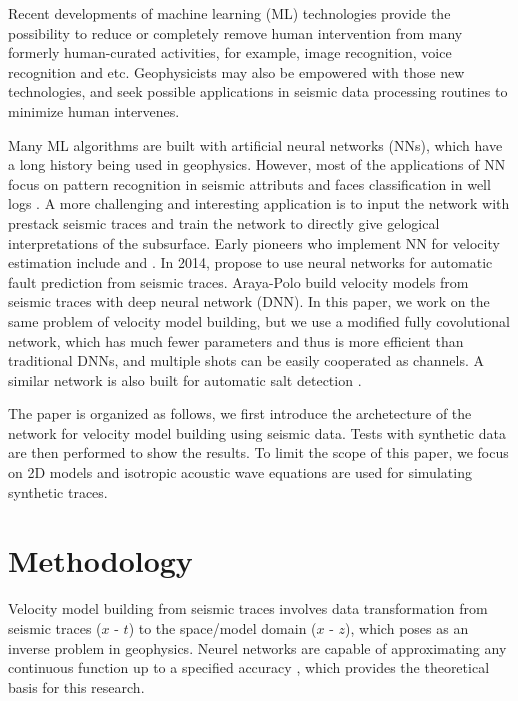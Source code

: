 \documentclass{segabs}
\begin{document}
Recent developments of machine learning (ML) technologies provide the possibility to reduce or completely remove human intervention from many formerly human-curated activities, for example, image recognition, voice recognition and etc. Geophysicists may also be empowered with those new technologies, and seek possible applications in seismic data processing routines to minimize human intervenes.

Many ML algorithms are built with artificial neural networks (NNs), which have a long history being used in geophysics. However, most of the applications of NN focus on pattern recognition in seismic attributs  \citep{zeng04,zhao15} and faces classification in well logs \citep{lim05,hall16}. A more challenging and interesting application is to input the network with prestack seismic traces and train the network to directly give gelogical interpretations of the subsurface. Early pioneers who implement NN for velocity estimation include \citet{roth94} and \citet{nath99}.
In 2014, \citet{zhang14} propose to use neural networks for automatic fault prediction from seismic traces. Araya-Polo \citet{araya18} build velocity models from seismic traces with deep neural network (DNN). 
In this paper, we work on the same problem of velocity model building, but we use a modified fully covolutional network, which has much fewer parameters and thus is more efficient than traditional DNNs, and multiple shots can be easily cooperated as channels. A similar network is also built for automatic salt detection \citep{wenlong18_salt}.

The paper is organized as follows, we first introduce the archetecture of the network for velocity model building using seismic data. Tests with synthetic data are then performed to show the results. To limit the scope of this paper, we focus on 2D models and isotropic acoustic wave equations are used for simulating synthetic traces.


\section{Methodology}

Velocity model building from seismic traces involves data transformation from seismic traces ($x$ - $t$) to the space/model domain ($x$ - $z$), which poses as an inverse problem in geophysics. Neurel networks are capable of approximating any continuous function up to a specified accuracy \citep{hornik89}, which provides the theoretical basis for this research.
\end{document}
